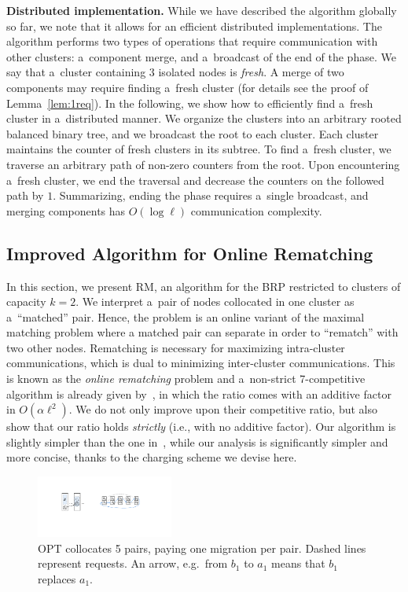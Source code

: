 \documentclass[a4paper,anonymous,USenglish]{lipics-v2019}
\newcommand{\OPT}{\textsc{OPT}\xspace}
\newcommand{\OBRP}{BRP\xspace}
\newcommand{\RM}{\textsc{RM}\xspace} %
\begin{document}
\medskip
\noindent
\textbf{Distributed implementation.}
While we have described the algorithm globally so far, we note that it allows for an efficient distributed implementations. 
The algorithm performs two types of operations that require communication with other clusters: a~component merge, and a~broadcast of the end of the phase.
We say that a~cluster containing $3$ isolated nodes is \emph{fresh}.
A merge of two components may require finding a~fresh cluster (for details see the proof of Lemma~\ref{lem:1req}).
In the following, we show how to efficiently find a~fresh cluster in a~distributed manner.
We organize the clusters into an arbitrary rooted balanced binary tree, and we broadcast the root to each cluster.
Each cluster maintains the counter of fresh clusters in its subtree.
To find a~fresh cluster, we traverse an arbitrary path of non-zero counters from the root.
Upon encountering a~fresh cluster, we end the traversal and decrease the counters on the followed path by $1$.
Summarizing, ending the phase requires a~single broadcast, and merging components has $O(\log \ell)$ communication complexity.

\subsection{Improved Algorithm for Online Rematching} \label{sec:k2}
In this section,
we present \RM,
 an algorithm for the \OBRP restricted to clusters of capacity $k=2$.
We interpret a~pair of nodes collocated in one cluster as a~``matched'' pair.
Hence,
the problem is an online variant of the maximal matching problem where
a matched pair can separate in order to ``rematch'' with two other nodes.
Rematching is necessary for  maximizing intra-cluster communications,
which is dual to minimizing inter-cluster communications.
This is known as the  \emph{online rematching} 
problem and a~non-strict 7-competitive algorithm is already given by~\cite{repartition-disc},
in which the ratio comes with an additive factor in $O(\alpha\ell^2)$.
We do not only improve upon their competitive ratio,
but also show that our ratio holds \emph{strictly}
(i.e., with no additive factor).
Our algorithm is slightly simpler than the one in~\cite{repartition-disc}, 
while our analysis is significantly  simpler and more concise,
thanks to the charging scheme we devise here.

\begin{figure}[H]
	\centering
	\includegraphics[width=0.4\textwidth]{figs/cyclic}
	\caption{
		\OPT  collocates 5 pairs, paying one migration per pair.
	Dashed lines represent requests.
	An arrow, e.g.~from $b_1$ to $a_1$ means  that $b_1$ replaces $a_1$. }
	\label{fig:cyclic}
\end{figure}
\end{document}
